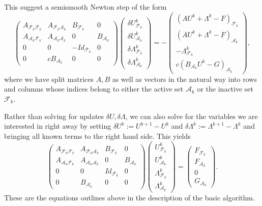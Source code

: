 \documentclass{article}
\begin{document}
This suggest a semismooth Newton step of the form
\begin{equation*}
 \begin{pmatrix}
 A_{\mathcal{F}_k\mathcal{F}_k} & A_{\mathcal{F}_k\mathcal{A}_k} & B_{\mathcal{F}_k} & 0\\
 A_{\mathcal{A}_k\mathcal{F}_k} & A_{\mathcal{A}_k\mathcal{A}_k} & 0 & B_{\mathcal{A}_k}\\
 0 & 0 & -Id_{\mathcal{F}_k} & 0\\
 0 & cB_{\mathcal{A}_k} & 0 & 0
\end{pmatrix}
\begin{pmatrix}
 \delta U^k_{\mathcal{F}_k}\\ \delta U^k_{\mathcal{A}_k}\\ \delta \Lambda^k_{\mathcal{F}_k}\\ \delta \Lambda^k_{\mathcal{A}_k}
\end{pmatrix}
=
-\begin{pmatrix}
 (AU^k + \Lambda^k - F)_{\mathcal{F}_k}\\ (AU^k + \Lambda^k - F)_{\mathcal{A}_k}\\ -\Lambda^k_{\mathcal{F}_k}\\ c(B_{\mathcal{A}_k} U^k - G)_{\mathcal{A}_k}
\end{pmatrix},
\end{equation*}
where we have split matrices $A,B$ as well as vectors in the natural way into
rows and columns whose indices belong to either the active set
${\mathcal{A}_k}$ or the inactive set ${\mathcal{F}_k}$.

Rather than solving for updates $\delta U, \delta \Lambda$, we can also solve
for the variables we are interested in right away by setting $\delta U^k :=
U^{k+1} - U^k$ and $\delta \Lambda^k := \Lambda^{k+1} - \Lambda^k$ and
bringing all known terms to the right hand side. This yields
\begin{equation*}
\begin{pmatrix}
 A_{\mathcal{F}_k\mathcal{F}_k} & A_{\mathcal{F}_k\mathcal{A}_k} & B_{\mathcal{F}_k} & 0\\
 A_{\mathcal{A}_k\mathcal{F}_k} & A_{\mathcal{A}_k\mathcal{A}_k} & 0 & B_{\mathcal{A}_k}\\
 0 & 0 & Id_{\mathcal{F}_k} & 0\\
 0 & B_{\mathcal{A}_k} & 0 & 0
\end{pmatrix}
\begin{pmatrix}
 U^k_{\mathcal{F}_k}\\ U^k_{\mathcal{A}_k}\\ \Lambda^k_{\mathcal{F}_k}\\ \Lambda^k_{\mathcal{A}_k}
\end{pmatrix}
=
\begin{pmatrix}
 F_{\mathcal{F}_k}\\ F_{\mathcal{A}_k}\\ 0\\ G_{\mathcal{A}_k}
\end{pmatrix}.
\end{equation*}
These are the equations outlines above in the description of the basic algorithm.
\end{document}

